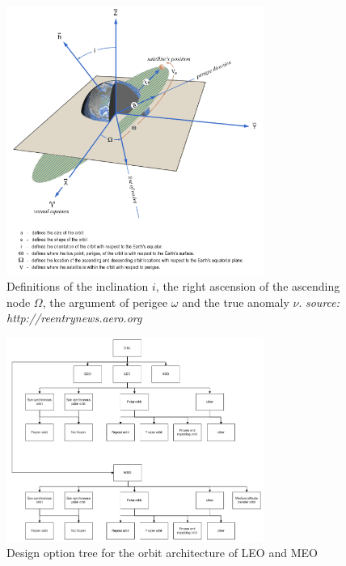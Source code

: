 \begin{figure} [ht]
\begin{center}
\includegraphics[width=0.75\textwidth,angle=0]{chapters/img/OrbElements.png}
\caption{Definitions of the inclination $i$, the right ascension of the ascending node $\Omega$, the argument of perigee $\omega$ and the true anomaly $\nu$. \emph{source: http://reentrynews.aero.org}}
\label{OrbElements}
\end{center}
\end{figure}

\begin{figure}
\centering
  \includegraphics[width=0.75\textwidth,angle=0]{chapters/img/blDOOrb1.jpg}
	\caption{Design option tree for the orbit architecture of LEO and MEO}
	\label{DOOrb1}
\end{figure}

